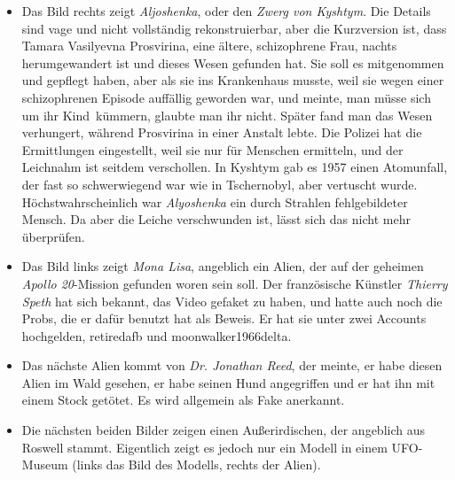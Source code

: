 \documentclass{scrartcl}
\begin{document}
\begin{itemize}
	\item Das Bild rechts zeigt \textit{Aljoshenka}, oder den \textit{Zwerg von Kyshtym}. Die Details sind vage und nicht vollständig rekonstruierbar, aber die Kurzversion ist, dass Tamara Vasilyevna Prosvirina, eine ältere, schizophrene Frau, nachts herumgewandert ist und dieses Wesen gefunden hat. Sie soll es mitgenommen und gepflegt haben, aber als sie ins Krankenhaus musste, weil sie wegen einer schizophrenen Episode auffällig geworden war, und meinte, man müsse sich um \frqq ihr Kind\flqq\ kümmern, glaubte man ihr nicht. Später fand man das Wesen verhungert, während Prosvirina in einer Anstalt lebte. Die Polizei hat die Ermittlungen eingestellt, weil sie \frqq nur für Menschen ermitteln\flqq, und der Leichnahm ist seitdem verschollen. In Kyshtym gab es 1957 einen Atomunfall, der fast so schwerwiegend war wie in Tschernobyl, aber vertuscht wurde. Höchstwahrscheinlich war \textit{Alyoshenka} ein durch Strahlen fehlgebildeter Mensch. Da aber die Leiche verschwunden ist, lässt sich das nicht mehr überprüfen.  
	\item Das Bild links zeigt \textit{Mona Lisa}, angeblich ein Alien, der auf der geheimen \textit{Apollo 20}-Mission gefunden woren sein soll. Der französische Künstler \textit{Thierry Speth} hat sich bekannt, das Video gefaket zu haben, und hatte auch noch die Probs, die er dafür benutzt hat als Beweis. Er hat sie unter zwei Accounts hochgelden, retiredafb und moonwalker1966delta.  

	\item Das nächste Alien kommt von \textit{Dr. Jonathan Reed}, der meinte, er habe diesen Alien im Wald gesehen, er habe seinen Hund angegriffen und er hat ihn mit einem Stock getötet. Es wird allgemein als Fake anerkannt.

	\item Die nächsten beiden Bilder zeigen einen \frqq Außerirdischen\flqq, der angeblich aus Roswell stammt. Eigentlich zeigt es jedoch nur ein Modell in einem UFO-Museum (links das Bild des Modells, rechts der \frqq Alien\flqq).


\end{itemize}
\end{document}
